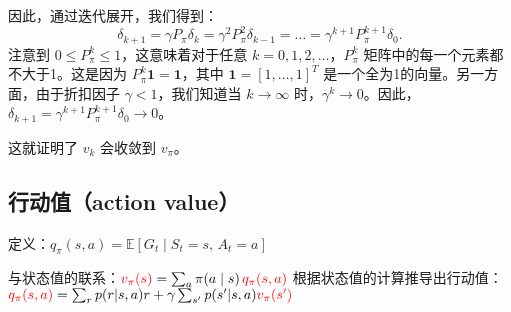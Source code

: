 \documentclass{article}
\begin{document}
因此，通过迭代展开，我们得到：
\[
\delta_{k+1} = \gamma P_{\pi} \delta_k = \gamma^2 P_{\pi}^2 \delta_{k-1} = \dots = \gamma^{k+1} P_{\pi}^{k+1} \delta_0.
\]
注意到 $0 \le P_{\pi}^k \le 1$，这意味着对于任意 $k=0, 1, 2, \dots$，$P_{\pi}^k$ 矩阵中的每一个元素都不大于1。这是因为 $P_{\pi}^k \mathbf{1} = \mathbf{1}$，其中 $\mathbf{1} = [1, \dots, 1]^T$ 是一个全为1的向量。另一方面，由于折扣因子 $\gamma < 1$，我们知道当 $k \to \infty$ 时，$\gamma^k \to 0$。因此，$\delta_{k+1} = \gamma^{k+1} P_{\pi}^{k+1} \delta_0 \to 0$。

这就证明了 $v_k$ 会收敛到 $v_{\pi}$。 
\subsection{行动值（action value）}
定义：$q_{\pi}(s, a) = \mathbb{E} \left[ G_t \mid S_t = s,\, A_t = a \right]$

与状态值的联系：$\textcolor{red}{v_{\pi}(s)} = \sum_{a} \pi(a \mid s) \, \textcolor{red}{q_{\pi}(s, a)}$
根据状态值的计算推导出行动值：$\textcolor{red}{q_{\pi}(s, a)} = \sum_{r} p(r|s, a)r + \gamma \sum_{s'} p(s'|s, a) \textcolor{red}{v_{\pi}(s')}$
\end{document}
